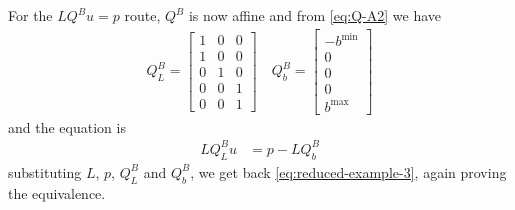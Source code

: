 \documentclass[11pt]{article}
\begin{document}
For the $LQ^Bu = p$ route, $Q^B$ is now affine and from \cref{eq:Q-A2} we have
\begin{align}
	Q^B_L = \begin{bmatrix}
		1 & 0 & 0 \\
		1 & 0 & 0 \\
		0 & 1 & 0 \\
		0 & 0 & 1 \\
		0 & 0 & 1
	\end{bmatrix}\quad
	Q^B_b = \begin{bmatrix}
		-b^{\min}\\0\\0\\0\\b^{\max}
	\end{bmatrix}
\end{align}
and the equation is
\begin{align}
	LQ^B_Lu &= p - LQ^B_b
\end{align}
substituting $L$, $p$, $Q^B_L$ and $Q^B_b$, we get back \cref{eq:reduced-example-3}, again proving the equivalence.
\end{document}
